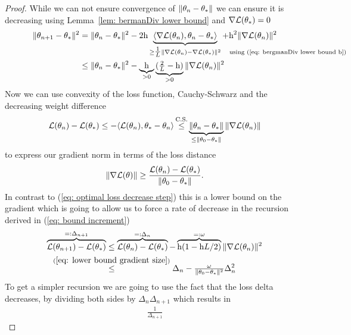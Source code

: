 \begin{proof}
	While we can not ensure convergence of \(\|\theta_n - \theta_*\|\) we can
	ensure it is decreasing using Lemma~\ref{lem: bermanDiv lower bound} and
	\(\nabla \mathcal{L}(\theta_*)=0\)
	\begin{align}
		\nonumber
		\|\weights_{n+1} - \minimum\|^2
		&= \|\weights_n - \minimum\|^2
		- 2\lr\underbrace{
			\langle \nabla\loss(\weights_n), \weights_n - \minimum\rangle
		}_{
			\ge \tfrac{1}\ubound \|\nabla \loss (\weights_n) - \nabla\loss(\minimum)\|^2
			\mathrlap{\quad \text{using (\ref{eq: bergmanDiv lower bound b})}}
		} + \lr^2\|\nabla \loss(\weights_n)\|^2
		\\
		&\le \|\weights_n - \minimum\|^2 - 
		\underbrace{\lr}_{>0}\underbrace{(\tfrac{2}{\ubound}-\lr)}_{>0}
		\|\nabla\loss(\weights_n)\|^2
		\label{eq: decreasing weight difference}
	\end{align}
	Now we can use convexity of the loss function, Cauchy-Schwarz and the
	decreasing weight difference
	\begin{align*}
		\loss(\weights_n)-\loss(\minimum)
		\le -\langle \loss(\weights_n), \minimum-\weights_n\rangle
		\xle{\text{C.S.}} \underbrace{\|\weights_n - \minimum\|}_{\le \|\weights_0 - \minimum\|}
		\|\nabla\loss(\weights_n)\|
	\end{align*}
	to express our gradient norm in terms of the loss distance
	\begin{align}\label{eq: lower bound gradient size}
		\|\nabla\mathcal{L}(\theta)\|
		\ge \frac{\mathcal{L}(\theta_n)-\mathcal{L}(\theta_*)}{\|\theta_0-\theta_*\|}.
	\end{align}
	In contrast to (\ref{eq: optimal loss decrease step}) this is a lower bound
	on the gradient which is going to allow us to force a rate of decrease in
	the recursion derived in (\ref{eq: bound increment})
	\begin{align*}
		\overbrace{\loss(\weights_{n+1}) - \loss(\minimum)}^{=:\Delta_{n+1}}
		&\le \overbrace{\loss(\weights_n)-\loss(\minimum)}^{=:\Delta_n}
		- \overbrace{\lr(1-\lr\ubound/2)}^{=:\omega} \|\nabla \loss(\weights_n)\|^2\\
		&\lxle{(\ref{eq: lower bound gradient size})} \Delta_n - \tfrac{\omega}{\|\weights_0-\minimum\|^2}\Delta_n^2
	\end{align*}
	To get a simpler recursion we are going to use the fact that the loss delta
	decreases, by dividing both sides by \(\Delta_n\Delta_{n+1}\) which results in
	\begin{align*}
		\frac{1}{\Delta_{n+1}}

\end{align*}
\end{proof}

